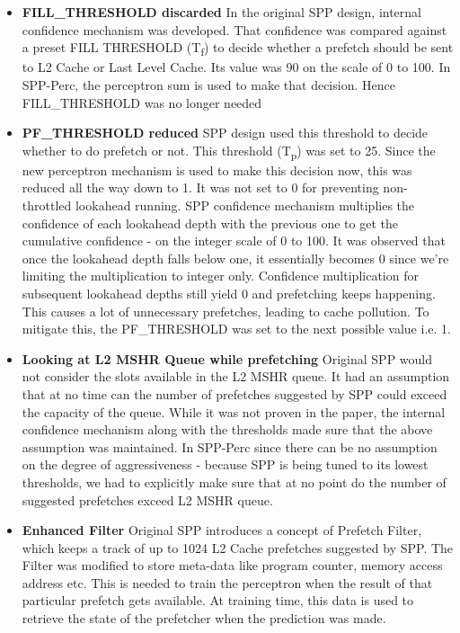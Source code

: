 \documentclass{sig-alternate}
\begin{document}
\begin{itemize}
\item \textbf{FILL\_THRESHOLD  discarded}\newline
In the original SPP design, internal confidence mechanism was developed. That confidence was compared against a preset FILL \textunderscore THRESHOLD (T\textsubscript{f}) to decide whether a prefetch should be sent to L2 Cache or Last Level Cache. Its value was 90 on the scale of 0 to 100. In SPP-Perc, the perceptron sum is used to make that decision. Hence FILL\_THRESHOLD was no longer needed

\item \textbf{PF\_THRESHOLD reduced}\newline
SPP design used this threshold to decide whether to do prefetch or not. This threshold (T\textsubscript{p}) was set to 25. Since the new perceptron mechanism is used to make this decision now, this was reduced all the way down to 1. It was not set to 0 for preventing non-throttled lookahead running. SPP confidence mechanism multiplies the confidence of each lookahead depth with the previous one to get the cumulative confidence - on the integer scale of 0 to 100. It was observed that once the lookahead depth falls below one, it essentially becomes 0 since we're limiting the multiplication to integer only. Confidence multiplication for subsequent lookahead depths still yield 0 and prefetching keeps happening. This causes a lot of unnecessary prefetches, leading to cache pollution. To mitigate this, the PF\_THRESHOLD was set to the next possible value i.e. 1. 


\item \textbf{Looking at L2 MSHR Queue while prefetching}\newline
Original SPP would not consider the slots available in the L2 MSHR queue. It had an assumption that at no time can the number of prefetches suggested by SPP could exceed the capacity of the queue. While it was not proven in the paper, the internal confidence mechanism along with the thresholds made sure that the above assumption was maintained. In SPP-Perc since there can be no assumption on the degree of aggressiveness - because SPP is being tuned to its lowest thresholds, we had to explicitly make sure that at no point do the number of suggested prefetches exceed L2 MSHR queue.

\item \textbf{Enhanced Filter}\newline
Original SPP introduces a concept of Prefetch Filter, which keeps a track of up to 1024 L2 Cache prefetches suggested by SPP. The Filter was modified to store meta-data like program counter, memory access address etc. This is needed to train the perceptron when the result of that particular prefetch gets available. At training time, this data is used to retrieve the state of the prefetcher when the prediction was made.


\end{itemize}
\end{document}
